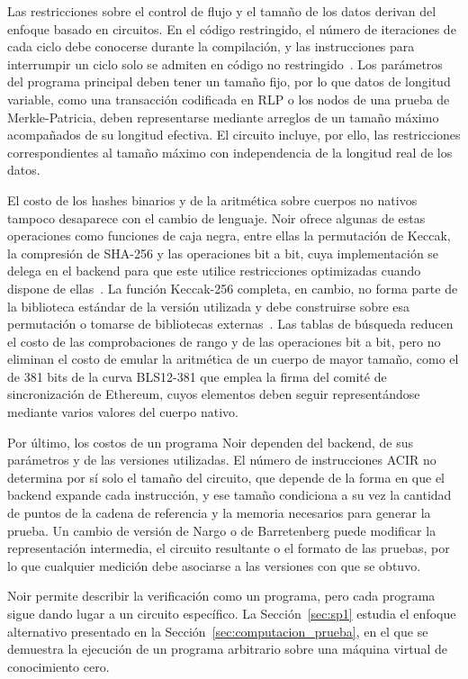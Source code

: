 Las restricciones sobre el control de flujo y el tamaño de los datos derivan del enfoque basado en
circuitos. En el código restringido, el número de iteraciones de cada ciclo debe conocerse durante
la compilación, y las instrucciones para interrumpir un ciclo solo se admiten en código no
restringido~\cite{noirdocsbeta}. Los parámetros del programa principal deben tener un tamaño fijo,
por lo que datos de longitud variable, como una transacción codificada en RLP o los nodos de una
prueba de Merkle-Patricia, deben representarse mediante arreglos de un tamaño máximo acompañados
de su longitud efectiva. El circuito incluye, por ello, las restricciones correspondientes
al tamaño máximo con independencia de la longitud real de los datos.

El costo de los hashes binarios y de la aritmética sobre cuerpos no nativos tampoco desaparece
con el cambio de lenguaje. Noir ofrece algunas de estas operaciones como funciones de caja negra,
entre ellas la permutación de Keccak, la compresión de SHA-256 y las operaciones bit a bit, cuya
implementación se delega en el backend para que este utilice restricciones optimizadas cuando
dispone de ellas~\cite{noirdocsbeta}. La función Keccak-256 completa, en cambio, no forma parte
de la biblioteca estándar de la versión utilizada y debe construirse sobre esa permutación o
tomarse de bibliotecas externas~\cite{noirdocsbeta}. Las tablas de búsqueda reducen el costo de
las comprobaciones de rango y de las operaciones bit a bit, pero no eliminan el costo de emular la
aritmética de un cuerpo de mayor tamaño, como el de 381 bits de la curva BLS12-381 que emplea la
firma del comité de sincronización de Ethereum, cuyos elementos deben seguir representándose
mediante varios valores del cuerpo nativo.

Por último, los costos de un programa Noir dependen del backend, de sus parámetros y de las
versiones utilizadas. El número de instrucciones ACIR no determina por sí solo el tamaño del
circuito, que depende de la forma en que el backend expande cada instrucción, y ese tamaño
condiciona a su vez la cantidad de puntos de la cadena de referencia y la memoria necesarios para
generar la prueba. Un cambio de versión de Nargo o de Barretenberg puede modificar la
representación intermedia, el circuito resultante o el formato de las pruebas, por lo que
cualquier medición debe asociarse a las versiones con que se obtuvo.

Noir permite describir la verificación como un programa, pero cada programa sigue dando lugar a
un circuito específico. La Sección~\ref{sec:sp1} estudia el enfoque alternativo presentado en la
Sección~\ref{sec:computacion_prueba}, en el que se demuestra la ejecución de un programa
arbitrario sobre una máquina virtual de conocimiento cero.
